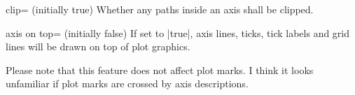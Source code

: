 \begin{pgfplotskey}{clip= (initially true)}
	Whether any paths inside an axis shall be clipped.
\end{pgfplotskey}

\begin{pgfplotskey}{axis on top= (initially false)}
	If set to |true|, axis lines, ticks, tick labels and grid lines will be drawn on top of plot graphics.
\begin{codeexample}[]
\end{codeexample}

\begin{codeexample}[]
\end{codeexample}
Please note that this feature does not affect plot marks. I think it looks unfamiliar if plot marks are crossed by axis descriptions.
\end{pgfplotskey}


